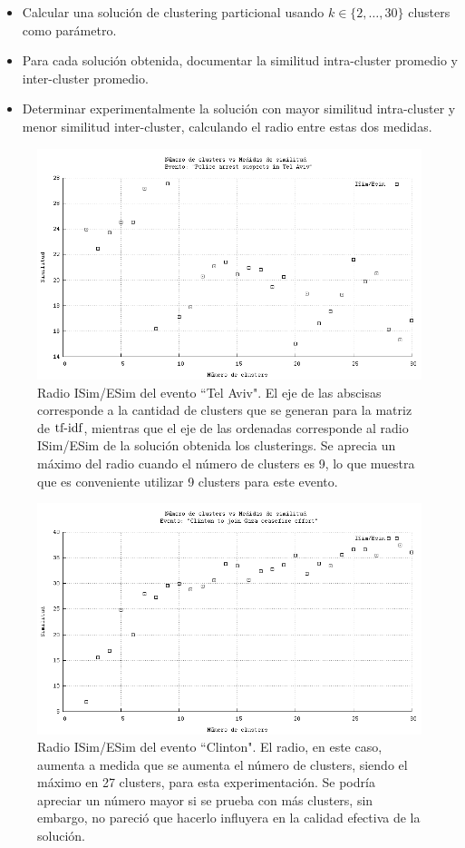 \begin{itemize}
\item Calcular una solución de clustering particional usando
  $k \in \{2,\ldots,30\}$ clusters como parámetro.
\item Para cada solución obtenida, documentar la similitud intra-cluster
  promedio y inter-cluster promedio.
\item Determinar experimentalmente la solución con mayor similitud
  intra-cluster y menor similitud inter-cluster, calculando el radio
  entre estas dos medidas.
\end{itemize}
\begin{figure}[h]
  \centering
  \includegraphics[width=12cm]{./img/telaviv-clusters-radio.png}
  \caption[Radios de similitud para evento 1]
   { Radio ISim/ESim del evento ``Tel Aviv". El eje de las abscisas corresponde a la cantidad de clusters que se generan para la matriz de $\operatorname{tf-idf}$, mientras que el eje de las ordenadas corresponde al radio ISim/ESim de la solución obtenida los clusterings. Se aprecia un máximo del radio cuando el número de clusters es 9, lo que muestra que es conveniente utilizar 9 clusters para este evento. \label{fig:telaviv-radio} }
\end{figure}

\begin{figure}[h]
  \centering
  \includegraphics[width=12cm]{./img/clinton-clusters-radio.png}
  \caption[Radios de similitud para evento 2]
   { Radio ISim/ESim del evento ``Clinton". El radio, en este caso, aumenta a medida que se aumenta el número de clusters, siendo el máximo en 27 clusters, para esta experimentación. Se podría apreciar un número mayor si se prueba con más clusters, sin embargo, no pareció que hacerlo influyera en la calidad efectiva de la solución. \label{fig:clinton-radio} }
\end{figure}


